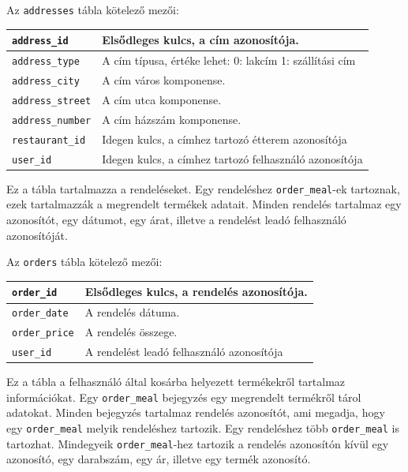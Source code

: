 \bigskip

\noindent Az \texttt{addresses} tábla kötelező mezői:

\bigskip

\begin{tabular}{|p{4cm}|p{9cm}|}
    \hline
    \texttt{address\_id} & Elsődleges kulcs, a cím azonosítója. \\
    \hline
    \texttt{address\_type} & A cím típusa, értéke lehet: 0: lakcím 1: szállítási cím \\
    \hline
    \texttt{address\_city} & A cím város komponense. \\
    \hline
    \texttt{address\_street} & A cím utca komponense. \\
    \hline
    \texttt{address\_number} & A cím házszám komponense. \\
    \hline
    \texttt{restaurant\_id} & Idegen kulcs, a címhez tartozó étterem azonosítója \\
    \hline
    \texttt{user\_id} & Idegen kulcs, a címhez tartozó felhasználó azonosítója \\
    \hline
\end{tabular}


Ez a tábla tartalmazza a rendeléseket. Egy rendeléshez \texttt{order\_meal}-ek tartoznak, ezek tartalmazzák a megrendelt termékek adatait. Minden rendelés tartalmaz egy azonosítót, egy dátumot, egy árat, illetve a rendelést leadó felhasználó azonosítóját.

\newpage

\noindent Az \texttt{orders} tábla kötelező mezői:

\bigskip

\begin{tabular}{|p{3cm}|p{10cm}|}
\hline
\texttt{order\_id} & Elsődleges kulcs, a rendelés azonosítója. \\
\hline
\texttt{order\_date} & A rendelés dátuma. \\
\hline
\texttt{order\_price} & A rendelés összege. \\
\hline
\texttt{user\_id} & A rendelést leadó felhasználó azonosítója \\
\hline
\end{tabular}


Ez a tábla a felhasználó által kosárba helyezett termékekről tartalmaz információkat. Egy \texttt{order\_meal} bejegyzés egy megrendelt termékről tárol adatokat. Minden bejegyzés tartalmaz rendelés azonosítót, ami megadja, hogy egy \texttt{order\_meal} melyik rendeléshez tartozik. Egy rendeléshez több \texttt{order\_meal} is tartozhat. Mindegyeik \texttt{order\_meal}-hez tartozik a rendelés azonosítón kívül egy azonosító, egy darabszám, egy ár, illetve egy termék azonosító.

